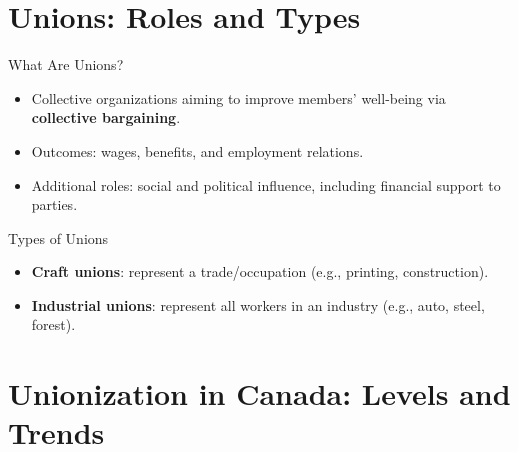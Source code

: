 \documentclass[aspectratio=169]{beamer}
\begin{document}
\section{Unions: Roles and Types}

\begin{frame}{What Are Unions?}
\transfade
\begin{itemize}[<+->]
  \item Collective organizations aiming to improve members' well-being via \textbf{collective bargaining}.
  \item Outcomes: wages, benefits, and employment relations.
  \item Additional roles: social and political influence, including financial support to parties.
\end{itemize}
\end{frame}

\begin{frame}{Types of Unions}
\transfade
\begin{itemize}[<+->]
  \item \textbf{Craft unions}: represent a trade/occupation (e.g., printing, construction).
  \item \textbf{Industrial unions}: represent all workers in an industry (e.g., auto, steel, forest).
\end{itemize}
\end{frame}

\section{Unionization in Canada: Levels and Trends}
\end{document}
